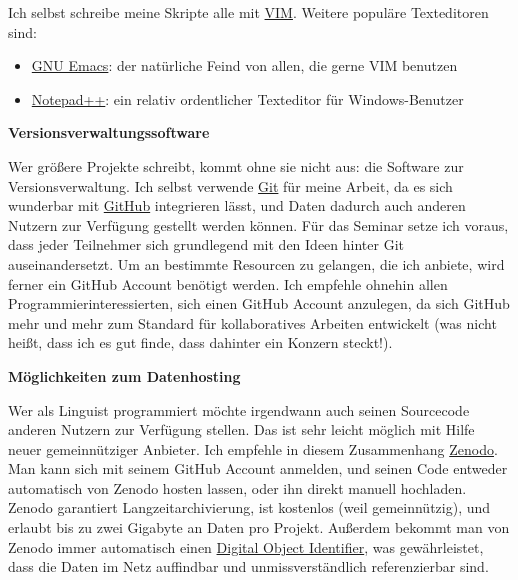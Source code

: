 Ich selbst schreibe meine Skripte alle mit \href{http://vim.org}{VIM}.
Weitere populäre Texteditoren sind:

\begin{itemize}
\itemsep1pt\parskip0pt
\item
  \href{https://www.gnu.org/software/emacs/}{GNU Emacs}: der natürliche
  Feind von allen, die gerne VIM benutzen
\item
  \href{http://de.wikipedia.org/wiki/Notepad++}{Notepad++}: ein relativ
  ordentlicher Texteditor für Windows-Benutzer
\end{itemize}



\vspace{0.5cm}\par\noindent\textbf{Versionsverwaltungssoftware}\vspace{0.5cm}

Wer größere Projekte schreibt, kommt ohne sie nicht aus: die Software
zur Versionsverwaltung. Ich selbst verwende
\href{http://de.wikipedia.org/wiki/Git}{Git} für meine Arbeit, da es
sich wunderbar mit \href{http://github.org}{GitHub} integrieren lässt,
und Daten dadurch auch anderen Nutzern zur Verfügung gestellt werden
können. Für das Seminar setze ich voraus, dass jeder Teilnehmer sich
grundlegend mit den Ideen hinter Git auseinandersetzt. Um an bestimmte
Resourcen zu gelangen, die ich anbiete, wird ferner ein GitHub Account
benötigt werden. Ich empfehle ohnehin allen Programmierinteressierten,
sich einen GitHub Account anzulegen, da sich GitHub mehr und mehr zum
Standard für kollaboratives Arbeiten entwickelt (was nicht heißt, dass
ich es gut finde, dass dahinter ein Konzern steckt!).



\vspace{0.5cm}\par\noindent\textbf{Möglichkeiten zum Datenhosting}\vspace{0.5cm}

Wer als Linguist programmiert möchte irgendwann auch seinen Sourcecode
anderen Nutzern zur Verfügung stellen. Das ist sehr leicht möglich mit
Hilfe neuer gemeinnütziger Anbieter. Ich empfehle in diesem Zusammenhang
\href{http://zenodo.org}{Zenodo}. Man kann sich mit seinem GitHub
Account anmelden, und seinen Code entweder automatisch von Zenodo hosten
lassen, oder ihn direkt manuell hochladen. Zenodo garantiert
Langzeitarchivierung, ist kostenlos (weil gemeinnützig), und erlaubt bis
zu zwei Gigabyte an Daten pro Projekt. Außerdem bekommt man von Zenodo
immer automatisch einen
\href{http://de.wikipedia.org/wiki/Digital_Object_Identifier}{Digital
Object Identifier}, was gewährleistet, dass die Daten im Netz auffindbar
und unmissverständlich referenzierbar sind.



